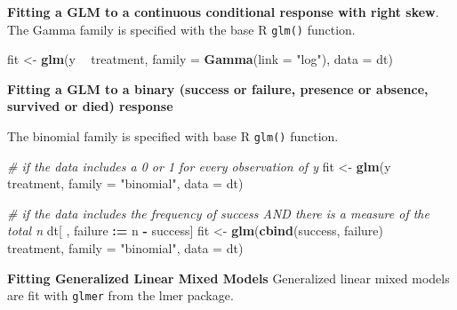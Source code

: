 \documentclass[]{book}
\newenvironment{Shaded}{\begin{snugshade}}{\end{snugshade}}
\newcommand{\CommentTok}[1]{\textcolor[rgb]{0.56,0.35,0.01}{\textit{#1}}}
\newcommand{\DataTypeTok}[1]{\textcolor[rgb]{0.13,0.29,0.53}{#1}}
\newcommand{\ErrorTok}[1]{\textcolor[rgb]{0.64,0.00,0.00}{\textbf{#1}}}
\newcommand{\KeywordTok}[1]{\textcolor[rgb]{0.13,0.29,0.53}{\textbf{#1}}}
\newcommand{\NormalTok}[1]{#1}
\newcommand{\OperatorTok}[1]{\textcolor[rgb]{0.81,0.36,0.00}{\textbf{#1}}}
\newcommand{\StringTok}[1]{\textcolor[rgb]{0.31,0.60,0.02}{#1}}
\begin{document}
\textbf{Fitting a GLM to a continuous conditional response with right skew}. The Gamma family is specified with the base R \texttt{glm()} function.

\begin{Shaded}
\begin{Highlighting}[]
\NormalTok{fit <-}\StringTok{ }\KeywordTok{glm}\NormalTok{(y }\OperatorTok{~}\StringTok{ }\NormalTok{treatment, }\DataTypeTok{family =} \KeywordTok{Gamma}\NormalTok{(}\DataTypeTok{link =} \StringTok{"log"}\NormalTok{), }\DataTypeTok{data =}\NormalTok{ dt)}
\end{Highlighting}
\end{Shaded}

\textbf{Fitting a GLM to a binary (success or failure, presence or absence, survived or died) response}

The binomial family is specified with base R \texttt{glm()} function.

\begin{Shaded}
\begin{Highlighting}[]
\CommentTok{# if the data includes a 0 or 1 for every observation of y}
\NormalTok{fit <-}\StringTok{ }\KeywordTok{glm}\NormalTok{(y }\OperatorTok{~}\StringTok{ }\NormalTok{treatment, }\DataTypeTok{family =} \StringTok{"binomial"}\NormalTok{, }\DataTypeTok{data =}\NormalTok{ dt)}

\CommentTok{# if the data includes the frequency of success AND there is a measure of the total n}
\NormalTok{dt[ , failure }\OperatorTok{:}\ErrorTok{=}\StringTok{ }\NormalTok{n }\OperatorTok{-}\StringTok{ }\NormalTok{success]}
\NormalTok{fit <-}\StringTok{ }\KeywordTok{glm}\NormalTok{(}\KeywordTok{cbind}\NormalTok{(success, failure) }\OperatorTok{~}\StringTok{ }\NormalTok{treatment, }\DataTypeTok{family =} \StringTok{"binomial"}\NormalTok{, }\DataTypeTok{data =}\NormalTok{ dt)}
\end{Highlighting}
\end{Shaded}

\textbf{Fitting Generalized Linear Mixed Models}
Generalized linear mixed models are fit with \texttt{glmer} from the lmer package.
\end{document}
